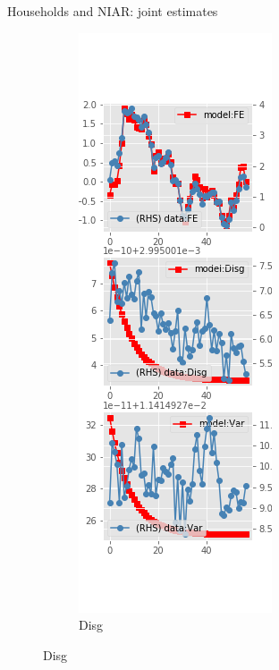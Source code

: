 \documentclass{beamer}
\begin{document}
\begin{frame}{Households and NIAR: joint estimates}
\begin{figure}[ht]
\begin{subfigure}[b]{0.2\textwidth}
		\end{subfigure}
		\hfill
		\begin{subfigure}[b]{0.2\textwidth}
			\caption{Disg}
			\includegraphics[width=\textwidth, height = 0.8\textheight]{figuresDraft/sce_ni_est_joint_diag1.png}

\end{subfigure}
\end{figure}
\end{frame}
\end{document}
